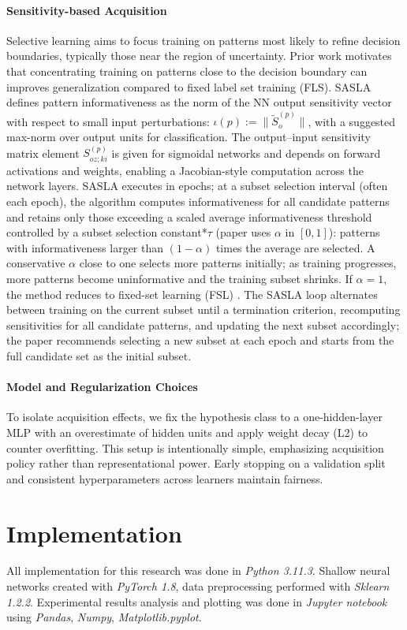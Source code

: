 \documentclass[conference]{IEEEtran}
\begin{document}
\paragraph*{Sensitivity-based Acquisition}
Selective learning aims to focus training on patterns most likely to refine decision boundaries, typically those near the region of uncertainty. Prior work motivates that concentrating training on patterns close to the decision boundary can improves generalization compared to fixed label set training (FLS). SASLA defines pattern informativeness as the norm of the NN output sensitivity vector with respect to small input perturbations: $\iota(p) := \lVert \tilde{S}_o^{(p)} \rVert$, with a suggested max-norm over output units for classification. The output–input sensitivity matrix element $S^{(p)}_{o z; k i}$ is given for sigmoidal networks and depends on forward activations and weights, enabling a Jacobian-style computation across the network layers. SASLA executes in epochs; at a subset selection interval (often each epoch), the algorithm computes informativeness for all candidate patterns and retains only those exceeding a scaled average informativeness threshold controlled by a subset selection constant*$\tau$ (paper uses $\alpha$ in $[0,1]$): patterns with informativeness larger than $(1-\alpha)$ times the average are selected. A conservative $\alpha$ close to one selects more patterns initially; as training progresses, more patterns become uninformative and the training subset shrinks. If $\alpha=1$, the method reduces to fixed-set learning (FSL)  . The SASLA loop alternates between training on the current subset until a termination criterion, recomputing sensitivities for all candidate patterns, and updating the next subset accordingly; the paper recommends selecting a new subset at each epoch and starts from the full candidate set as the initial subset.
\paragraph*{Model and Regularization Choices}
To isolate acquisition effects, we fix the hypothesis class to a one-hidden-layer MLP with an overestimate of hidden units and apply weight decay (L2) to counter overfitting. This setup is intentionally simple, emphasizing acquisition policy rather than representational power. Early stopping on a validation split and consistent hyperparameters across learners maintain fairness.


\section*{Implementation}
All implementation for this research was done in \emph{Python 3.11.3}. Shallow neural networks created with \emph{PyTorch 1.8}, data preprocessing performed with \emph{Sklearn 1.2.2}. Experimental results analysis and plotting was done in \emph{Jupyter notebook} using \emph{Pandas}, \emph{Numpy}, \emph{Matplotlib.pyplot}. 
\end{document}

